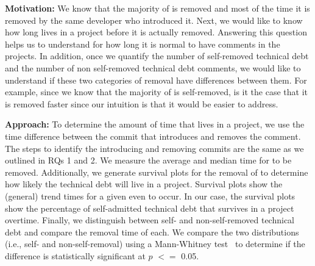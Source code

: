 \noindent\rqiii

\noindent \textbf{Motivation:} We know that the majority of \SATD is removed and most of the time it is removed by the same developer who introduced it. Next, we would like to know how long \SATD lives in a project before it is actually removed. Answering this question helps us to understand for how long it is normal to have \SATD comments in the projects. In addition, once we quantify the number of self-removed technical debt and the number of non self-removed technical debt comments, we would like to understand if these two categories of removal have differences between them. For example, since we know that the majority of \SATD is self-removed, is it the case that it is removed faster since our intuition is that it would be easier to address. 

\noindent \textbf{Approach:} To determine the amount of time that \SATD lives in a project, we use the time difference between the commit that introduces and removes the \SATD comment. The steps to identify the \SATD introducing and removing commits are the same as we outlined in RQs 1 and 2. We measure the average and median time for \SATD to be removed. Additionally, we generate survival plots for the removal of \SATD to determine how likely the technical debt will live in a project. Survival plots show the (general) trend times for a given even to occur. In our case, the survival plots show the  percentage of self-admitted technical debt that survives in a project overtime. Finally, we distinguish between self- and non-self-removed technical debt and compare the removal time of each. We compare the two distributions (i.e., self- and non-self-removal) using a Mann-Whitney test~\cite{mann1947test} to determine if the difference is statistically significant at $p$ $<$$=$ 0.05.



